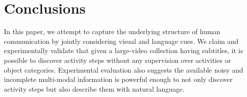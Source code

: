 \section{Conclusions}
In this paper, we attempt to capture the underlying structure of human communication by jointly considering visual and language cues. We claim and experimentally validate that given a large-video collection having subtitles, it is possible to discover activity steps without any supervision over activities or object categories. Experimental evaluation also suggests the available noisy and incomplete multi-modal information is powerful enough to not only discover activity steps but also describe them with natural language.
